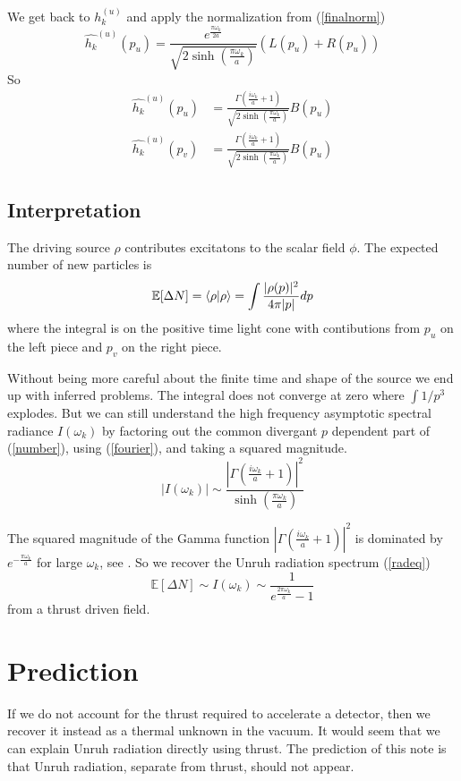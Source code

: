 \documentclass[12pt,a4paper]{article}
\begin{document}
We get back to $h_k^{(u)}$ and apply the normalization from (\ref{finalnorm})
\[
\hat{h_k}^{(u)}(p_u) = \frac{e^{\frac{\pi \omega_k}{2a}}}{\sqrt{2 \sinh \left({\frac{\pi\omega_k}{a}}\right)}}  ( L(p_u) + R(p_u) )
\]
So
\begin{equation}
\label{fourier}
\begin{split}
\hat{h_k}^{(u)}(p_u) & = \frac{\Gamma\left(\frac{i\omega_k}{a} + 1\right)}{\sqrt{2 \sinh \left({\frac{\pi\omega_k}{a}}\right)}} B(p_u)\\
\hat{h_k}^{(u)}(p_v) &= \frac{\Gamma\left(\frac{i\omega_k}{a} + 1\right)}{\sqrt{2 \sinh \left({\frac{\pi\omega_k}{a}}\right)}} B(p_u)
\end{split}
\end{equation}
\subsection{Interpretation}
The driving source $\rho$ contributes excitatons to the scalar field $\phi$.  The expected number of new particles is
\begin{equation}
  \label{number}
  \mathbb{E}[\Delta N] = \braket{\rho|\rho} = \int{\frac{|\rho(p)|^2}{4\pi|p|}dp}
\end{equation}
where the integral is on the positive time light cone with contibutions from $p_u$ on the left piece and $p_v$ on the right piece.

Without being more careful about the finite time and shape of the source we end up with inferred problems.  The integral does not converge at zero where $\int{1/p^3}$ explodes.  But we can still understand the high frequency asymptotic spectral radiance $I(\omega_k)$ by factoring out the common divergant $p$ dependent part of (\ref{number}), using (\ref{fourier}), and taking a squared magnitude.
\[
|I(\omega_k)| \sim \frac{\left|\Gamma\left(\frac{i\omega_k}{a} + 1\right) \right|^2}{\sinh\left(\frac{\pi\omega_k}{a}\right)}
\]

The squared magnitude of the Gamma function $\left|\Gamma\left(\frac{i\omega_k}{a} + 1\right) \right|^2$ is dominated by $e^{-\frac{\pi\omega_k}{a}}$ for large $\omega_k$, see \cite{gamma}. So we recover the Unruh radiation spectrum (\ref{radeq}) 
\[
  \mathbb{E}[\Delta N] \sim I(\omega_k) \sim \frac{1}{e^{\frac{2 \pi \omega_k}{a}}-1}
\]
from a thrust driven field.

\section{Prediction}
If we do not account for the thrust required to accelerate a detector, then we recover it instead as a thermal unknown in the vacuum.  It would seem that we can explain Unruh radiation directly using thrust.  The prediction of this note is that Unruh radiation, separate from thrust, should not appear.



\end{document}
